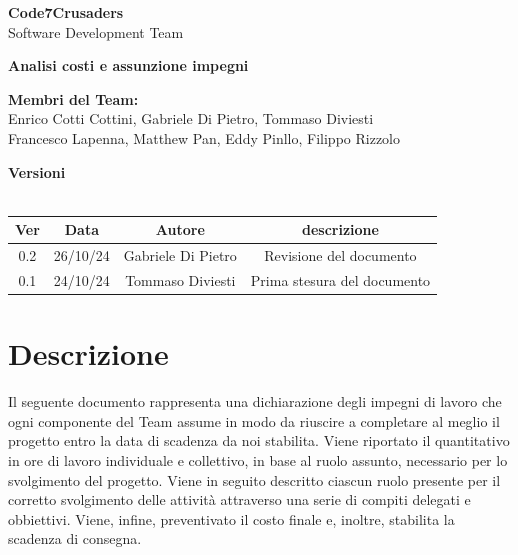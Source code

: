 \documentclass{article}
\begin{document}
\begin{titlepage}
    {\Huge \textbf{Code7Crusaders}}\\
    \vspace{0.5cm}
    {\Large Software Development Team}\\
    \vspace{2cm}
    
    \large \textbf{Analisi costi e assunzione impegni}
    \vspace{5cm}

    \textbf{Membri del Team:}\\
    Enrico Cotti Cottini, Gabriele Di Pietro, Tommaso Diviesti \\
    Francesco Lapenna, Matthew Pan, Eddy Pinllo, Filippo Rizzolo \\
    \vspace{0.5cm}
    
    \vspace{1cm}
\end{titlepage}

\newpage
\begin{center}
    \newline
    \textbf{Versioni}
    \\
    \\
    \begin{tabular}{|c|c|c|c|}
        \hline
        \textbf{Ver} & \textbf{Data} & \textbf{Autore} & \textbf{descrizione}\\
        \hline
        0.2 & 26/10/24 & Gabriele Di Pietro & Revisione del documento \\
        0.1 & 24/10/24 & Tommaso Diviesti & Prima stesura del documento \\
        \hline
    \end{tabular}
\end{center}

\newpage
\tableofcontents
\newpage

\section{Descrizione}
Il seguente documento rappresenta una dichiarazione degli impegni di lavoro che ogni componente del Team assume in modo da 
riuscire a completare al meglio il progetto entro la data di scadenza da noi stabilita. Viene riportato il quantitativo in 
ore di lavoro individuale e collettivo, in base al ruolo assunto, necessario per lo svolgimento del progetto. Viene in seguito 
descritto ciascun ruolo presente per il corretto svolgimento delle attività attraverso una serie di compiti delegati e obbiettivi. 
Viene, infine, preventivato il costo finale e, inoltre, stabilita la scadenza di consegna.
\newpage
\end{document}
